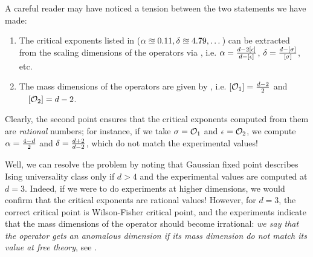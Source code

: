 \documentclass[12pt]{article}
\numberwithin{equation}{section}
\begin{document}
A careful reader may have noticed a tension between the two statements we have made:
\begin{enumerate}
	\item The critical exponents listed in  ($\alpha\approxeq0.11,\delta\approxeq4.79,\dots$) can be extracted from the scaling dimensions of the operators via , i.e. $	\alpha=\frac{d-2[\epsilon]}{d-[\epsilon]}$, $\delta=\frac{d-[\sigma]}{[\sigma]}$, etc.
	\item The mass dimensions of the operators are given by , i.e. $[\mathcal{O}_1]=\frac{d-2}{2}$ and \mbox{$\quad [\mathcal{O}_2]=d-2$}.
\end{enumerate}
Clearly, the second point ensures that the critical exponents computed from them are \emph{rational} numbers; for instance, if we take $\sigma=\mathcal{O}_1$ and $\epsilon=\mathcal{O}_2$, we compute $\alpha=\frac{4-d}{2}$ and $\delta=\frac{d+2}{d-2}$, which do not match the experimental values!

Well, we can resolve the problem by noting that Gaussian fixed point describes Ising universality class only if $d>4$ and the experimental values are computed at $d=3$. Indeed, if we were to do experiments at higher dimensions, we would confirm that the critical exponents are rational values! However, for $d=3$, the correct critical point is Wilson-Fisher critical point, and the experiments indicate that the mass dimensions of the operator should become irrational: \emph{we say that the operator gets an anomalous dimension if its mass dimension do not match its value at free theory}, see \tabref{\ref{table: ising universality class as dimension changes}}.
\end{document}
